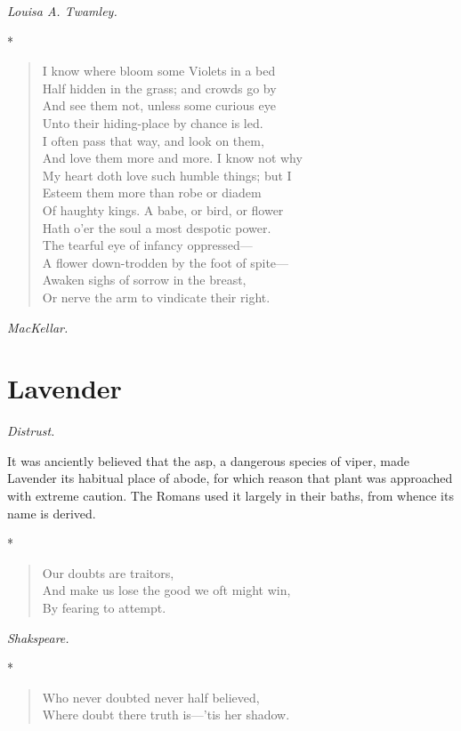 \documentclass[11pt,twoside]{article}
\newcommand\flower[2]{\section*{#1}\addcontentsline{toc}{section}{#1}%
  \noindent\textit{#2.}\par\medskip}
\newcommand\stars{\begin{center}*\quad*\quad*\end{center}}
\newcommand\by[1]{\par\hfill\textit{#1}\par}
\begin{document}
\by{Louisa A. Twamley.}

\stars

\begin{verse}
I know where bloom some Violets in a bed\\
\quad Half hidden in the grass; and crowds go by\\
\quad And see them not, unless some curious eye\\
Unto their hiding-place by chance is led.\\
\quad I often pass that way, and look on them,\\
And love them more and more. I know not why\\
My heart doth love such humble things; but I\\
\quad Esteem them more than robe or diadem\\
Of haughty kings. A babe, or bird, or flower\\
Hath o’er the soul a most despotic power.\\
\quad The tearful eye of infancy oppressed---\\
A flower down-trodden by the foot of spite---\\
\quad Awaken sighs of sorrow in the breast,\\
Or nerve the arm to vindicate their right.
\end{verse}

\by{MacKellar.}

\flower{Lavender}{Distrust}

It was anciently believed that the asp, a dangerous species of viper, made Lavender its habitual place of abode, for which reason that plant was approached with extreme caution. The Romans used it largely in their baths, from whence its name is derived.

\stars

\begin{verse}
\quad Our doubts are traitors,\\
And make us lose the good we oft might win,\\
By fearing to attempt.
\end{verse}

\by{Shakspeare.}

\stars

\begin{verse}
Who never doubted never half believed,\\
Where doubt there truth is---’tis her shadow.
\end{verse}
\end{document}
